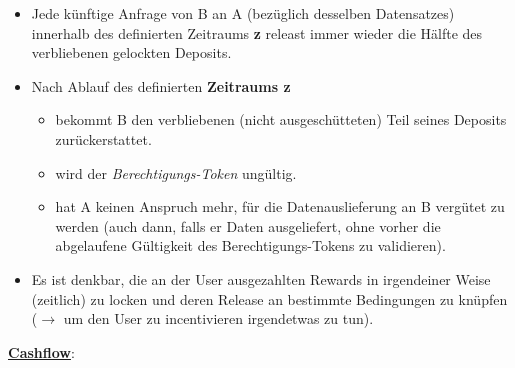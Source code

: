 \begin{Solution}
\begin{itemize}
  \item Jede künftige Anfrage von B an A (bezüglich desselben Datensatzes) innerhalb des definierten Zeitraums \textbf{z} releast immer wieder die Hälfte des verbliebenen gelockten Deposits.
  \item Nach Ablauf des definierten \textbf{Zeitraums z}
  \begin{itemize}
  	\item bekommt B den verbliebenen (nicht ausgeschütteten) Teil seines Deposits zurückerstattet.
  	\item wird der \textit{Berechtigungs-Token} ungültig.
  	\item hat A keinen Anspruch mehr, für die Datenauslieferung an B vergütet zu werden (auch dann, falls er Daten ausgeliefert, ohne vorher die abgelaufene Gültigkeit des Berechtigungs-Tokens zu validieren).
  \end{itemize}
  \item Es ist denkbar, die an der User ausgezahlten Rewards in irgendeiner Weise (zeitlich) zu locken und deren Release an bestimmte Bedingungen zu knüpfen ($\rightarrow$ um den User zu incentivieren irgendetwas zu tun).
\end{itemize}

\vspace{0.5cm}

\underline{\textbf{Cashflow}}:


\end{Solution}
